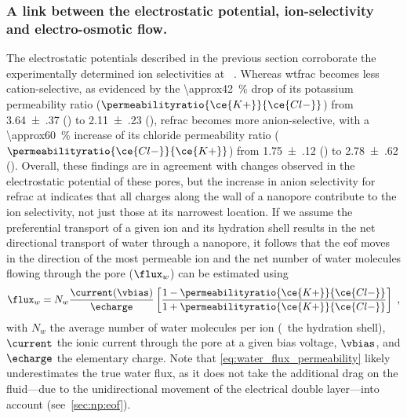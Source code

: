 \subsubsection{A link between the electrostatic potential, ion-selectivity and electro-osmotic flow.}
%
%

The electrostatic potentials described in the previous section corroborate the experimentally determined ion
selectivities at ~\cite{Huang-2017}. Whereas \gls{wtfrac} becomes less cation-selective, as
evidenced by the \SI{\approx42}{\percent} drop of its potassium permeability ratio
($\permeabilityratio{\ce{K+}}{\ce{Cl-}}$) from \num{3.64(37)} () to \num{2.11(23)} (),
\gls{refrac} becomes more anion-selective, with a \SI{\approx60}{\percent} increase of its chloride
permeability ratio ($\permeabilityratio{\ce{Cl-}}{\ce{K+}}$) from \num{1.75(12)} () to \num{2.78(62)}
(). Overall, these findings are in agreement with changes observed in the electrostatic potential of
these pores, but the increase in anion selectivity for \gls{refrac} at  indicates that all charges
along the wall of a nanopore contribute to the ion selectivity, not just those at its narrowest location. If
we assume the preferential transport of a given ion and its hydration shell results in the net directional
transport of water through a nanopore, it follows that the \gls{eof} moves in the direction of the most
permeable ion and the net number of water molecules flowing through the pore ($\flux_{w}$) can be estimated
using~\cite{Piguet-2014}
%
\begin{equation}\label{eq:water_flux_permeability}
  \flux_{w} = N_{w} \dfrac{\current(\vbias)}{\echarge} 
    \left[ \dfrac%
        {1 - \permeabilityratio{\ce{K+}}{\ce{Cl-}}}%
        {1 + \permeabilityratio{\ce{K+}}{\ce{Cl-}}}%
    \right]
    \text{ ,}
\end{equation}
%
with $N_{w}$ the average number of water molecules per ion (\ie~the hydration shell), $\current$ the ionic
current through the pore at a given bias voltage, $\vbias$, and $\echarge$ the elementary charge. Note that
\cref{eq:water_flux_permeability} likely underestimates the true water flux, as it does not take the
additional drag on the fluid---due to the unidirectional movement of the electrical double layer---into
account (see~\cref{sec:np:eof}).

